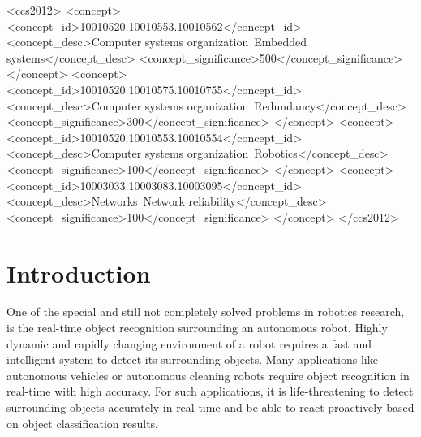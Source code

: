 \documentclass[sigconf]{acmart}
\begin{document}
%
%
\begin{CCSXML}
<ccs2012>
 <concept>
  <concept_id>10010520.10010553.10010562</concept_id>
  <concept_desc>Computer systems organization~Embedded systems</concept_desc>
  <concept_significance>500</concept_significance>
 </concept>
 <concept>
  <concept_id>10010520.10010575.10010755</concept_id>
  <concept_desc>Computer systems organization~Redundancy</concept_desc>
  <concept_significance>300</concept_significance>
 </concept>
 <concept>
  <concept_id>10010520.10010553.10010554</concept_id>
  <concept_desc>Computer systems organization~Robotics</concept_desc>
  <concept_significance>100</concept_significance>
 </concept>
 <concept>
  <concept_id>10003033.10003083.10003095</concept_id>
  <concept_desc>Networks~Network reliability</concept_desc>
  <concept_significance>100</concept_significance>
 </concept>
</ccs2012>
\end{CCSXML}


%



%
\maketitle

\section{Introduction}
One of the special and still not completely solved problems in robotics research, is the real-time object recognition surrounding an autonomous robot. Highly dynamic and rapidly changing environment of a robot requires a fast and intelligent system to detect its surrounding objects. Many applications like autonomous vehicles or autonomous cleaning robots require object recognition in real-time with high accuracy. 
For such applications, it is life-threatening to detect surrounding objects accurately in real-time and be able to react proactively based on object classification results. 
\end{document}
